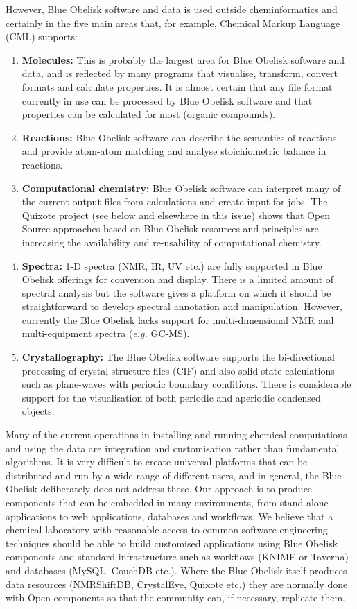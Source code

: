 \documentclass[10pt]{bmc_article}
\newenvironment{bmcformat}{\fussy\setboolean{publ}{true}}{\fussy}
\begin{document}
\begin{bmcformat}
However, Blue Obelisk software and data is used outside
cheminformatics and certainly in the five main areas that, for
example, Chemical Markup Language (CML) \cite{murray-rust_chemical_1999} supports:

\begin{enumerate}
\item {\bf Molecules:} This is probably the largest area for Blue
Obelisk software and data, and is reflected by many programs that
visualise, transform, convert formats and calculate properties. It is
almost certain that any file format currently in use can be processed by Blue
Obelisk software and that properties can be calculated for most (organic
compounds).
\item {\bf Reactions:} Blue Obelisk software can describe the
semantics of reactions and provide atom-atom matching and analyse
stoichiometric balance in reactions.
\item {\bf Computational chemistry:} Blue Obelisk software can
interpret many of the current output files from calculations and
create input for jobs. The Quixote project (see below and elsewhere in
this issue) shows that Open Source approaches based on Blue Obelisk
resources and principles are increasing the availability and
re-usability of computational chemistry.
\item {\bf Spectra:} 1-D spectra (NMR, IR, UV etc.) are fully
supported in Blue Obelisk offerings for conversion and display. There
is a limited amount of spectral analysis but the software gives a
platform on which it should be straightforward to develop spectral
annotation and manipulation. However, currently the Blue Obelisk lacks
support for multi-dimensional NMR and multi-equipment spectra
({\it e.g.} GC-MS).
\item {\bf Crystallography:} The Blue Obelisk software supports the
bi-directional processing of crystal structure files (CIF) and also
solid-state calculations such as plane-waves with periodic boundary
conditions. There is considerable support for the visualisation of
both periodic and aperiodic condensed objects.
\end{enumerate}

Many of the current operations in installing and running chemical
computations and using the data are integration and customisation
rather than fundamental algorithms. It is very difficult to create
universal platforms that can be distributed and run by a wide range of
different users, and in general, the Blue Obelisk deliberately does
not address these. Our approach is to produce components that can be
embedded in many environments, from stand-alone applications to web
applications, databases and workflows.
We believe that a chemical laboratory with reasonable access to common
software engineering techniques should be able to build customised applications
using Blue Obelisk components and standard infrastructure such as
workflows (KNIME or Taverna) and databases (MySQL, CouchDB etc.).
Where the Blue Obelisk itself produces data resources (NMRShiftDB,
CrystalEye, Quixote etc.) they are normally done with Open components
so that the community can, if necessary, replicate them.


\end{bmcformat}
\end{document}
